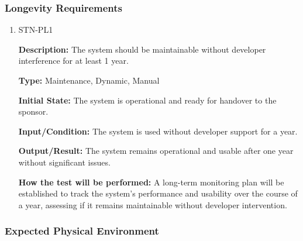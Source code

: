 \documentclass[12pt, titlepage]{article}
\begin{document}
\subsubsection{Longevity Requirements}

\begin{enumerate}

\item{STN-PL1\\}

\textbf{Description:} The system should be maintainable without developer interference for at least 1 year.

\textbf{Type:} Maintenance, Dynamic, Manual

\textbf{Initial State:} The system is operational and ready for handover to the sponsor.

\textbf{Input/Condition:} The system is used without developer support for a year.

\textbf{Output/Result:} The system remains operational and usable after one year without significant issues.

\textbf{How the test will be performed:} A long-term monitoring plan will be established to track the system’s performance and usability over the course of a year, assessing if it remains maintainable without developer intervention.

\end{enumerate}

\subsubsection{Expected Physical Environment}
\end{document}
